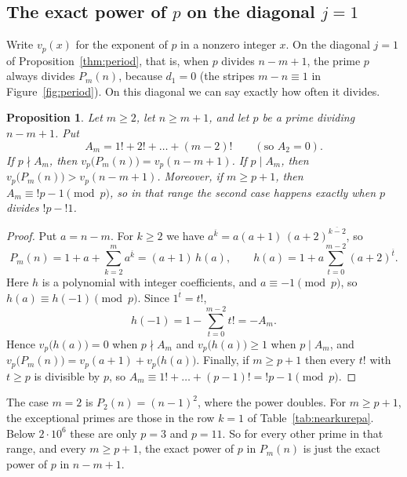 \documentclass[11pt]{amsart}
\theoremstyle{plain}
\newtheorem{proposition}[theorem]{Proposition}
\theoremstyle{definition}
\theoremstyle{remark}
\begin{document}
\subsection{\texorpdfstring{The exact power of $p$ on the diagonal $j=1$}{The exact power of p on the diagonal j=1}}
Write $v_p(x)$ for the exponent of $p$ in a nonzero integer $x$. On the
diagonal $j=1$ of Proposition~\ref{thm:period}, that is, when $p$ divides
$n-m+1$, the prime $p$ always divides $P_m(n)$, because $d_1=0$ (the stripes
$m-n\equiv1$ in Figure~\ref{fig:period}). On this diagonal we can say exactly
how often it divides.

\begin{proposition}\label{prop:val}
Let $m\ge2$, let $n\ge m+1$, and let $p$ be a prime dividing $n-m+1$. Put
\[
  A_m=1!+2!+\dots+(m-2)!\qquad(\text{so }A_2=0).
\]
If $p\nmid A_m$, then $v_p\bigl(P_m(n)\bigr)=v_p(n-m+1)$. If $p\mid A_m$, then
$v_p\bigl(P_m(n)\bigr)>v_p(n-m+1)$. Moreover, if $m\ge p+1$, then
$A_m\equiv{!p}-1\pmod p$, so in that range the second case happens exactly when
$p$ divides $!p-{!1}$.
\end{proposition}

\begin{proof}
Put $a=n-m$. For $k\ge2$ we have $a^{\overline{k}}=a(a+1)\,(a+2)^{\overline{k-2}}$,
so
\[
  P_m(n)=1+a+\sum_{k=2}^{m}a^{\overline{k}}=(a+1)\,h(a),\qquad
  h(a)=1+a\sum_{t=0}^{m-2}(a+2)^{\overline{t}}.
\]
Here $h$ is a polynomial with integer coefficients, and $a\equiv-1\pmod p$, so
$h(a)\equiv h(-1)\pmod p$. Since $1^{\overline{t}}=t!$,
\[
  h(-1)=1-\sum_{t=0}^{m-2}t!=-A_m .
\]
Hence $v_p\bigl(h(a)\bigr)=0$ when $p\nmid A_m$ and $v_p\bigl(h(a)\bigr)\ge1$
when $p\mid A_m$, and $v_p\bigl(P_m(n)\bigr)=v_p(a+1)+v_p\bigl(h(a)\bigr)$.
Finally, if $m\ge p+1$ then every $t!$ with $t\ge p$ is divisible by $p$, so
$A_m\equiv1!+\dots+(p-1)!={!p}-1\pmod p$.
\end{proof}

The case $m=2$ is $P_2(n)=(n-1)^2$, where the power doubles. For $m\ge p+1$,
the exceptional primes are those in the row $k=1$ of
Table~\ref{tab:nearkurepa}. Below $2\cdot10^6$ these are only $p=3$ and
$p=11$. So for every other prime in that range, and every $m\ge p+1$, the
exact power of $p$ in $P_m(n)$ is just the exact power of $p$ in $n-m+1$.
\end{document}
